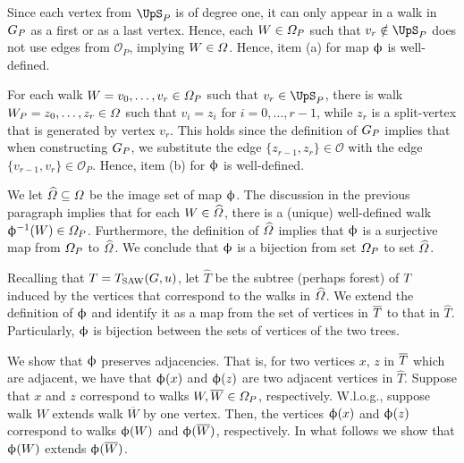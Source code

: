 \documentclass[11pt,reqno]{amsart}
\numberwithin{equation}{section}
\newcommand{\cO}{{\mathcal{O}}}
\newcommand{\blue}[1]{{\color{blue}#1}}
\newcommand{\bostonuniversityred}[1]{{\color{bostonuniversityred}#1}}
\newcommand{\capri}[1]{{\color{capri}#1}}
\newcommand{\cadmiumgreen}[1]{{\color{cadmiumgreen}#1}}
\newcommand{\electricviolet}[1]{{\color{electricviolet}#1}}
\newcommand{\goldenbrown}[1]{{\color{goldenbrown}#1}}
\newcommand{\heliotrope}[1]{{\color{heliotrope}#1}}
\newcommand{\red}[1]{{\color{red}#1}}
\newcommand{\Tsaw}{T_{\rm SAW}}
\renewcommand{\blue}[1]{#1}
\renewcommand{\bostonuniversityred}[1]{#1}
\renewcommand{\capri}[1]{#1}
\renewcommand{\cadmiumgreen}[1]{#1}
\renewcommand{\electricviolet}[1]{#1}
\renewcommand{\goldenbrown}[1]{#1}
\renewcommand{\heliotrope}[1]{#1}
\renewcommand{\red}[1]{#1}
\newcommand{\ki}{\capri{i}}
\newcommand{\kP}{\goldenbrown{P}}
\newcommand{\kr}{\bostonuniversityred{r}}%
\newcommand{\ku}{\red{u}}
\newcommand{\kv}{\electricviolet{v}}
\newcommand{\kW}{\blue{W}}
\newcommand{\kx}{\heliotrope{x}}
\newcommand{\kz}{\cadmiumgreen{z}}
\renewcommand{\ki}{i}
\renewcommand{\kP}{P}
\renewcommand{\kr}{r}
\renewcommand{\ku}{u}
\renewcommand{\kv}{v}
\renewcommand{\kW}{W}
\renewcommand{\kx}{x}
\renewcommand{\kz}{z}
\begin{document}
Since each vertex from $\ssplit_{\kP}$ is of degree one,  it can only appear in a walk in $\gext{G}{\kP}$ 
as a first or as a last vertex. Hence, each $\kW \in \sawpaths_{\kP}$ such that $\kv_{\kr}\notin \ssplit_{\kP}$ 
does not use edges from $\cO_{\kP}$,  implying $\kW\in \sawpaths$. Hence,  item (a)  for map
$\upphi$  is well-defined. 




For each walk $\kW=\kv_0, \ldots, \kv_{\kr} \in \sawpaths_{\kP}$ such that $\kv_{\kr}\in \ssplit_{\kP}$, there 
is walk $\kW_{\kP}=\kz_0, \ldots, \kz_{\kr} \in \sawpaths$  such that $\kv_{\ki}=\kz_{\ki}$ for $\ki=0,\ldots, \kr-1$, 
while $\kz_{\kr}$  is a split-vertex that is generated by vertex $\kv_{\kr}$.  This holds since the definition of  
$\gext{G}{\kP}$ implies that when constructing $\gext{G}{\kP}$, we substitute  the edge  $\{\kz_{\kr-1}, \kz_{\kr}\}\in \cO$ 
with the edge $\{\kv_{\kr-1}, \kv_{\kr}\}\in \cO_{\kP}$.  Hence,  item (b) for $\upphi$ is well-defined. 




We let $\widehat{\Omega} \subseteq \Omega$ be the image set of map $\upphi$. The discussion in the 
previous paragraph  implies that for each $\kW\in \widehat{\sawpaths}$,  there is a (unique) well-defined walk 
$\BBijection^{-1}(\kW)\in \sawpaths_{\kP}$.  Furthermore, the definition of $\widehat{\Omega}$  implies that 
$\upphi$ is a surjective map from $\sawpaths_{\kP}$ to $\widehat{\Omega}$.  We conclude that 
$\upphi$ is a bijection from set $\sawpaths_{\kP}$ to set $\widehat{\Omega}$. 





Recalling that $\SMTu=\Tsaw(G,\ku)$,  let $\widehat{T}$ be the subtree (perhaps forest) of $T$ 
induced by the vertices that  correspond to the walks in $\widehat{\Omega}$.  We extend the definition 
of $\upphi$ and identify  it as a map from the set of vertices  in $\SMTPu$ to that in $\widehat{T}$. 
Particularly,   $\upphi$  is bijection between the  sets of vertices of the two trees. 


We show that $\upphi$ preserves adjacencies. That is, for two vertices $\kx$, $\kz$ in $\SMTPu$
which are adjacent, we have that $\BBijection(\kx)$ and $\BBijection(\kz)$ are two adjacent vertices in 
$\widehat{T}$.  Suppose that $\kx$ and $\kz$ correspond to walks $\kW, \overline{\kW}\in \sawpaths_{\kP}$, 
respectively. W.l.o.g., suppose  walk $ \kW$ extends walk $\overline{\kW}$ by  one vertex. Then, the 
vertices  $\BBijection(\kx)$ and $\BBijection(\kz)$ correspond to walks $\BBijection(\kW)$ and 
$\BBijection(\overline{\kW})$, respectively. In what follows we show that  $\BBijection(\kW)$ 
extends $\BBijection(\overline{\kW})$.  
\end{document}
